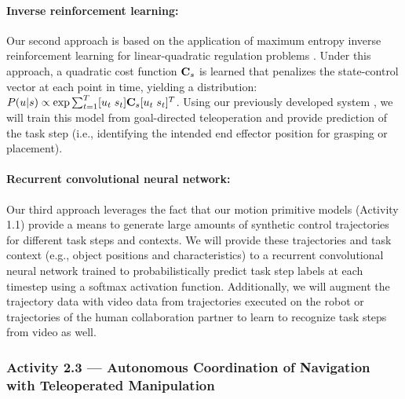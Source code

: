 \documentclass[letterpaper, 11 pt, onecolumn]{article}
\begin{document}
\paragraph{Inverse reinforcement learning:}

Our second approach is based on the application of maximum entropy inverse reinforcement learning for linear-quadratic regulation problems \cite{ziebart2010modeling}.  Under this approach, a quadratic cost function ${\bf C}_s$ is learned that penalizes the state-control vector at each point in time, yielding a distribution: $P(u|s) \propto \exp{\sum_{t=1}^T [u_t \; s_t] {\bf C}_s [u_t \; s_t]^T}$.  Using our previously developed system \cite{monfort2015intent,schultz2017goal}, we will train this model from goal-directed teleoperation and provide prediction of the task step (i.e., identifying the intended end effector position for grasping or placement).

\paragraph{Recurrent convolutional neural network: }

Our third approach leverages the fact that our motion primitive models (Activity 1.1) provide a means to generate large amounts of synthetic control trajectories for different task steps and contexts.  
We will provide these trajectories and task context (e.g., object positions and characteristics) to a recurrent convolutional neural network \cite{veeriah2015differential} trained to probabilistically predict task step labels at each timestep using a softmax activation function.  Additionally, we will augment the trajectory data with video data from trajectories executed on the robot or trajectories of the human collaboration partner to learn to recognize task steps from video as well. 


\subsubsection{Activity 2.3 --- Autonomous Coordination of Navigation with Teleoperated Manipulation}\label{sec:plan-intent-SharedAutonomousCoordiantion}
\end{document}
